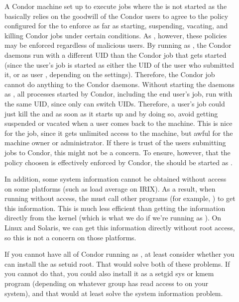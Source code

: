 \begin{description}

\item[] A Condor machine set up to execute jobs where the
    is not started as the 
   basically relies on the goodwill of the Condor users to agree to the policy
   configured for the  to enforce as far as starting, suspending,
   vacating, and killing Condor jobs under certain conditions. 
   As , however, these policies may be enforced regardless of
   malicious users.  By running as , the Condor daemons run with a
   different UID than the Condor job that gets started (since the
   user's job is started as either the UID of the user who submitted
   it, or as user , depending on the 
   settings).  Therefore, the Condor job cannot do anything to the
   Condor daemons.  Without starting the daemons as , all
   processes started by Condor, including the end user's job, run with
   the same UID, since only  can switch UIDs.
   Therefore, a user's job could just kill the  and
    as soon as it starts up and by doing so, avoid
   getting suspended or vacated when a user comes back to the machine.
   This is nice for the job, since it gets unlimited access to the
   machine, but awful for the machine owner or administrator.  If there is
   trust of the users submitting jobs to Condor, this might not be a
   concern.  To ensure, however, that the policy choosen is
   effectively enforced by Condor, the  should be
   started as .

   In addition, some system information cannot be obtained without
    access on some platforms (such as load average on IRIX).  As a
   result, when running without  access, the  must
   call other programs (for example, ) to get this
   information.  This is much less efficient than getting the
   information directly from the kernel (which is what we do if we're
   running as ).  On Linux and Solaris, we can get this
   information directly without root access, so this is not a concern
   on those platforms.

   If you cannot have all of Condor running as , at least consider
   whether you can install the  as setuid root.  That
   would solve both of these problems.  If you cannot do that, you
   could also install it as a setgid sys or kmem program (depending on
   whatever group has read access to  on your system),
   and that would at least solve the system information problem.


\end{description}
